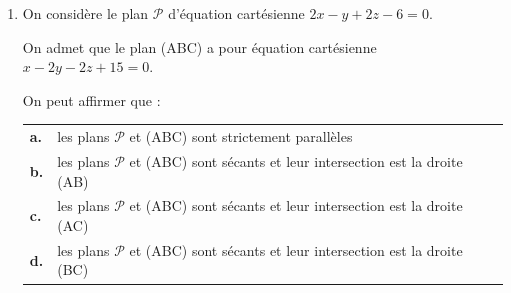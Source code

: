 \begin{enumerate}
\item On considère le plan $\mathcal{P}$ d'équation cartésienne $2x - y + 2z - 6 = 0$.

On admet que le plan (ABC) a pour équation cartésienne $x-2 y-2 z+15=0$.

On peut affirmer que :

\begin{tabularx}{\linewidth}
{@{}>{\bfseries}p{5mm}@{}X }
a.& les plans $\mathcal{P}$ et (ABC) sont strictement parallèles\\
b.& les plans $\mathcal{P}$ et (ABC) sont sécants et leur intersection est la droite (AB)\\
c.& les plans $\mathcal{P}$ et (ABC) sont sécants et leur intersection est la droite (AC)\\
d.& les plans $\mathcal{P}$ et (ABC) sont sécants et leur intersection est la droite (BC)\\
\end{tabularx}
\end{enumerate}

\bigskip
